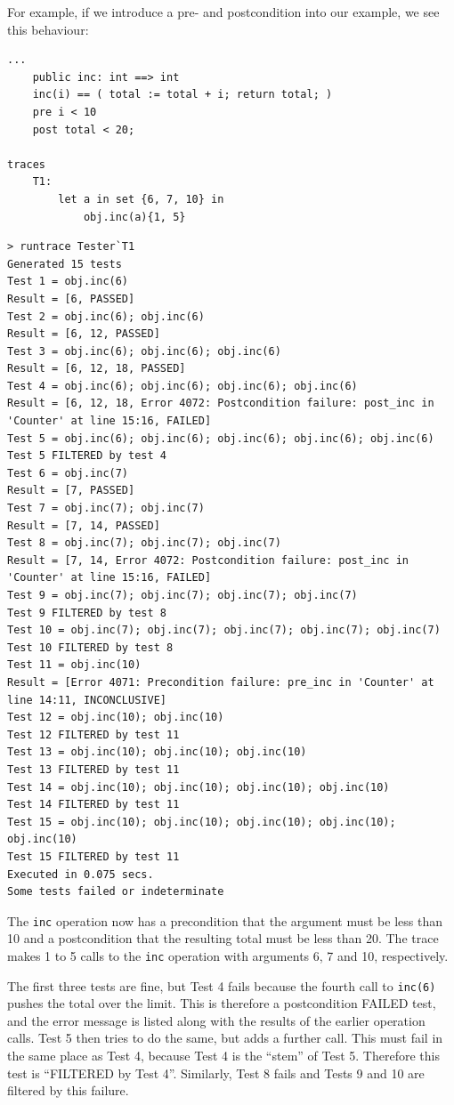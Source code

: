 \documentclass{overturerepchap}
\begin{document}
For example, if we introduce a pre- and postcondition into our example, we see
this behaviour:

\small
\begin{lstlisting}
...
    public inc: int ==> int
    inc(i) == ( total := total + i; return total; )
    pre i < 10
    post total < 20;

traces
    T1:
        let a in set {6, 7, 10} in
            obj.inc(a){1, 5}
\end{lstlisting}

\scriptsize
\begin{verbatim}
> runtrace Tester`T1
Generated 15 tests
Test 1 = obj.inc(6)
Result = [6, PASSED]
Test 2 = obj.inc(6); obj.inc(6)
Result = [6, 12, PASSED]
Test 3 = obj.inc(6); obj.inc(6); obj.inc(6)
Result = [6, 12, 18, PASSED]
Test 4 = obj.inc(6); obj.inc(6); obj.inc(6); obj.inc(6)
Result = [6, 12, 18, Error 4072: Postcondition failure: post_inc in 'Counter' at line 15:16, FAILED]
Test 5 = obj.inc(6); obj.inc(6); obj.inc(6); obj.inc(6); obj.inc(6)
Test 5 FILTERED by test 4
Test 6 = obj.inc(7)
Result = [7, PASSED]
Test 7 = obj.inc(7); obj.inc(7)
Result = [7, 14, PASSED]
Test 8 = obj.inc(7); obj.inc(7); obj.inc(7)
Result = [7, 14, Error 4072: Postcondition failure: post_inc in 'Counter' at line 15:16, FAILED]
Test 9 = obj.inc(7); obj.inc(7); obj.inc(7); obj.inc(7)
Test 9 FILTERED by test 8
Test 10 = obj.inc(7); obj.inc(7); obj.inc(7); obj.inc(7); obj.inc(7)
Test 10 FILTERED by test 8
Test 11 = obj.inc(10)
Result = [Error 4071: Precondition failure: pre_inc in 'Counter' at line 14:11, INCONCLUSIVE]
Test 12 = obj.inc(10); obj.inc(10)
Test 12 FILTERED by test 11
Test 13 = obj.inc(10); obj.inc(10); obj.inc(10)
Test 13 FILTERED by test 11
Test 14 = obj.inc(10); obj.inc(10); obj.inc(10); obj.inc(10)
Test 14 FILTERED by test 11
Test 15 = obj.inc(10); obj.inc(10); obj.inc(10); obj.inc(10); obj.inc(10)
Test 15 FILTERED by test 11
Executed in 0.075 secs. 
Some tests failed or indeterminate
\end{verbatim}
\normalsize

The \texttt{inc} operation now has a precondition that the argument must be
less than 10 and a postcondition that the resulting total must be less than 20.
The trace makes 1 to 5 calls to the \texttt{inc} operation with arguments 6, 7
and 10, respectively.

The first three tests are fine, but Test 4 fails because the fourth call to
\texttt{inc(6)} pushes the total over the limit. This is therefore a
postcondition FAILED test, and the error message is listed along with the
results of the earlier operation calls. Test 5 then tries to do the same, but
adds a further call. This must fail in the same place as Test 4, because Test 4
is the ``stem'' of Test 5. Therefore this test is ``FILTERED by Test 4''.
Similarly, Test 8 fails and Tests 9 and 10 are filtered by this failure.
\end{document}
